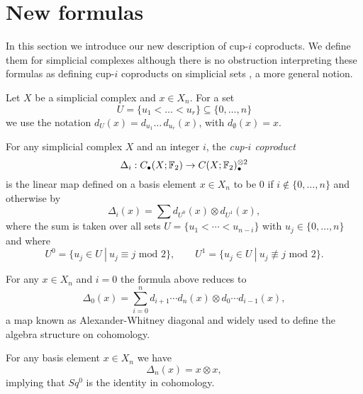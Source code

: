 
\section{New formulas} \label{s:formulas}

In this section we introduce our new description of cup-$i$ coproducts.
We define them for simplicial complexes although there is no obstruction interpreting these formulas as defining cup-$i$ coproducts on simplicial sets \cite{friedman2012simplicial}, a more general notion.

Let $X$ be a simplicial complex and $x \in X_n$.
For a set
\begin{equation*}
U = \{u_1 < \dots < u_r\} \subseteq \{0, \dots, n\}
\end{equation*}
we use the notation $d_U(x) = d_{u_1} \ldots\, d_{u_r}(x)$, with $d_{\emptyset}(x) = x$.

\begin{definition} \label{d:cup-i coproducts}	
	For any simplicial complex $X$ and an integer $i$, the \textit{cup-$i$ coproduct}
	\begin{equation*}
	\Delta_i : C_\bullet(X; \mathbb{F}_2) \to C(X; \mathbb{F}_2)^{\otimes 2}_\bullet
	\end{equation*}
	is the linear map defined on a basis element $x \in X_n$ to be $0$ if $i \not\in \{0, \dots, n\}$ and otherwise by
	\begin{equation} \label{equation: simplicial cup-i coproducts}
	\Delta_i(x) = \sum d_{U^0}(x) \otimes d_{U^1}(x),
	\end{equation}
	where the sum is taken over all sets $U = \{u_1 < \cdots < u_{n-i}\}$ with $u_j \in \{0, \dots, n\}$ and where
	\begin{equation*}
	U^0 = \{u_j \in U\ |\ u_j \equiv j \text{ mod } 2\}, \qquad
	U^1 = \{u_j \in U\ |\ u_j \not\equiv j \text{ mod } 2\}.
	\end{equation*}
\end{definition}

\begin{example}
	For any $x \in X_n$ and $i = 0$ the formula above reduces to
	\begin{equation*}
	\Delta_0(x) = \sum_{i=0}^n d_{i+1} \cdots d_{n}(x) \otimes d_{0} \cdots d_{i-1}(x),
	\end{equation*}
	a map known as Alexander-Whitney diagonal and widely used to define the algebra structure on cohomology.
\end{example}

\begin{example}
	For any basis element $x \in X_n$ we have
	\begin{equation*}
	\Delta_n(x) = x \otimes x,
	\end{equation*}
	implying that $Sq^0$ is the identity in cohomology.
\end{example}


